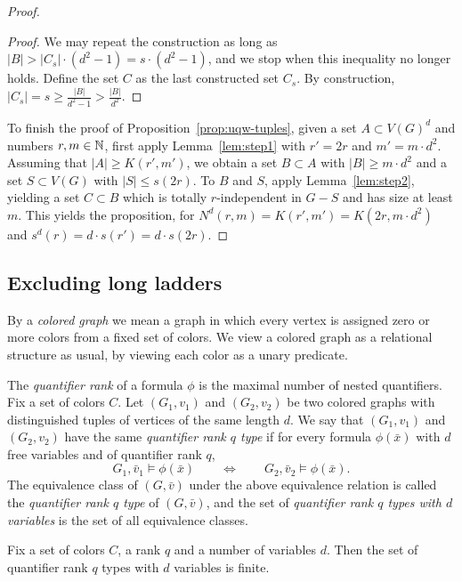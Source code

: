 \begin{proof}
\begin{proof}
We may repeat the construction as long as $|B|>|C_s|\cdot (d^2-1)=s\cdot (d^2-1)$, and we stop when this inequality no longer holds. Define the set $C$ as the last constructed set $C_s$.
By construction, $|C_s|=s\ge 
\frac{|B|}{d^2-1}>\frac{|B|}{d^2}$.	
\end{proof}

To finish the proof of Proposition~\ref{prop:uqw-tuples},
given a set $A\subset V(G)^d$ and numbers $r,m\in\mathbb{N}$,
first apply Lemma~\ref{lem:step1} 
  with $r'=2r$ and
 $m'= m\cdot d^2$.
 Assuming that $|A|\ge K(r',m')$, 
we obtain a set $B\subset A$ with $|B|\ge m\cdot d^2$ and a set $S\subset V(G)$ with $|S|\le s(2r)$.
To $B$ and $S$, apply Lemma~\ref{lem:step2}, yielding a set $C\subset B$ which is totally $r$-independent in $G-S$ and has size at least $m$. This yields the proposition, for $N^d(r,m)=K(r',m')=K(2r,m\cdot d^2)$ and $s^d(r)=d\cdot s(r')=d\cdot s(2r)$.
\end{proof}


\subsection{Excluding long ladders}
\label{sec:uqw-stable}
By a \emph{colored graph} we mean a graph  in which 
every vertex is assigned zero or more colors from a fixed set of colors. We view a colored graph as a relational structure as usual, by viewing each color as a unary predicate. 

The \emph{quantifier rank} of a formula $\phi$ is the maximal number of nested quantifiers. Fix a set of colors $C$.
Let $(G_1,v_1)$ and $(G_2,v_2)$ be two
colored graphs with distinguished tuples of vertices of the same length $d$. We say that $(G_1,v_1)$ and $(G_2,v_2)$
have the same \emph{quantifier rank $q$ type}
if for every formula $\phi(\bar x)$ with $d$ free variables and of quantifier rank $q$,
 $$G_1,\bar v_1\models \phi(\bar x)\qquad\iff \qquad G_2,\bar v_2\models \phi(\bar x).$$
 The equivalence class of $(G,\bar v)$ under the above equivalence relation is called the \emph{quantifier rank $q$ type} of $(G,\bar v)$, and  the set of \emph{quantifier rank $q$ types with $d$ variables}
is the set of all equivalence classes.

\begin{lemma}\label{lem:q-types}
	Fix a set of colors $C$, a rank $q$ and a number of variables $d$.
	Then the set of quantifier rank $q$ types with $d$ variables is finite.
\end{lemma}





